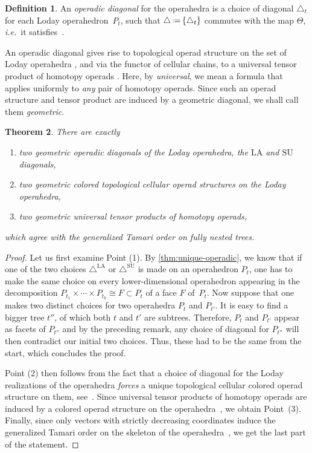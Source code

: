 \documentclass{amsart}
\newcommand{\darkblue}{\color{darkblue}} %
\newtheorem{theorem}{Theorem}[section]
\theoremstyle{definition}
\newtheorem{definition}[theorem]{Definition}
\newcommand{\eqdef}{\mbox{\,\raisebox{0.2ex}{\scriptsize\ensuremath{\mathrm:}}\ensuremath{=}\,}} %
\newcommand{\ie}{\textit{i.e.}~} %
\newcommand{\defn}[1]{\textsl{\darkblue #1}} %
\newcommand{\SU}{\mathrm{SU}}
\newcommand{\LA}{\mathrm{LA}}
\newcommand{\SUD}{\triangle^{\mathrm{SU}}}
\newcommand{\LAD}{\triangle^{\mathrm{LA}}}
\begin{document}
\begin{definition}
An \emph{operadic diagonal} for the operahedra is a choice of diagonal $\triangle_t$ for each Loday operahedron~$P_t$, such that $\triangle \eqdef \{\triangle_t\}$ commutes with the map $\Theta$, \ie it satisfies~\cite[Prop.~4.14]{LaplanteAnfossi}.
\end{definition}

An operadic diagonal gives rise to topological operad structure on the set of Loday operahedra \cite[Thm 4.18]{LaplanteAnfossi}, and via the functor of cellular chains, to a universal tensor product of homotopy operads \cite[Prop. 4.27]{LaplanteAnfossi}. 
Here, by \defn{universal}, we mean a formula that applies uniformly to \emph{any} pair of homotopy operads. 
Since such an operad structure and tensor product are induced by a geometric diagonal, we shall call them \defn{geometric}.

\begin{theorem}
\label{thm:operahedra}
There are exactly 
\begin{enumerate}
\item two geometric operadic diagonals of the Loday operahedra, the $\LA$ and $\SU$ diagonals,
\item two geometric colored topological cellular operad structures on the Loday operahedra,
\item two geometric universal tensor products of homotopy operads,
\end{enumerate}
which agree with the generalized Tamari order on fully nested trees. 
\end{theorem}

\begin{proof}
Let us first examine Point (1).
By \cref{thm:unique-operadic}, we know that if one of the two choices $\LAD$ or $\SUD$ is made on an operahedron $P_t$, one has to make the same choice on every lower-dimensional operahedron appearing in the decomposition $P_{t_1} \times \cdots \times P_{t_k} \cong F \subset P_t$ of a face $F$ of~$P_t$. 
Now suppose that one makes two distinct choices for two operahedra $P_t$ and $P_{t'}$.
It is easy to find a bigger tree $t''$, of which both $t$ and $t'$ are subtrees.
Therefore, $P_t$ and $P_{t'}$ appear as facets of $P_{t''}$ and by the preceding remark, any choice of diagonal for $P_{t''}$ will then contradict our initial two choices. 
Thus, these had to be the same from the start, which concludes the proof. 

Point (2) then follows from the fact that a choice of diagonal for the Loday realizations of the operahedra \emph{forces} a unique topological cellular colored operad structure on them, see~\cite[Thm.~4.18]{LaplanteAnfossi}.
Since universal tensor products of homotopy operads are induced by a colored operad structure on the operahedra~\cite[Coro.~4.24]{LaplanteAnfossi}, we obtain Point~(3).
Finally, since only vectors with strictly decreasing coordinates induce the generalized Tamari order on the skeleton of the operahedra~\cite[Prop.~3.11]{LaplanteAnfossi}, we get the last part of the statement. 
\end{proof}
\end{document}
